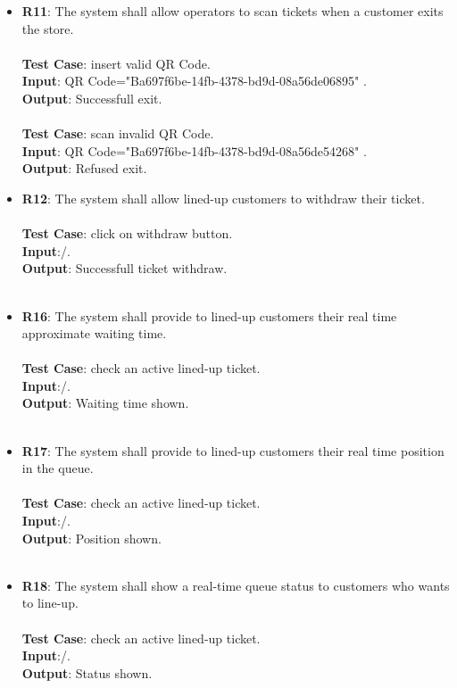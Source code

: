 \begin{itemize}
	\item \textbf{R11}: The system shall allow operators to scan tickets when a customer exits the store. \\ \\ \textbf{Test Case}: insert valid QR Code.  \\ 
 \textbf{Input}: QR Code="Ba697f6be-14fb-4378-bd9d-08a56de06895" .\\ 		\textbf{Output}: Successfull exit. \\ \\ \textbf{Test Case}: scan invalid QR Code.\\ 
 \textbf{Input}: QR Code="Ba697f6be-14fb-4378-bd9d-08a56de54268" .\\ 		\textbf{Output}: Refused exit. \\


	\item \textbf{R12}: The system shall allow lined-up customers to withdraw their ticket. \\ \\ \textbf{Test Case}: click on withdraw button.  \\ 
 \textbf{Input}:/.\\ 		\textbf{Output}: Successfull ticket withdraw. \\ \\


	\item \textbf{R16}: The system shall provide to lined-up customers their real time approximate waiting time. \\ \\ \textbf{Test Case}: check an active lined-up ticket.  \\ 
 \textbf{Input}:/.\\ 		\textbf{Output}: Waiting time shown. \\ \\


	\item \textbf{R17}: The system shall provide to lined-up customers their real time position in the queue. \\ \\ \textbf{Test Case}: check an active lined-up ticket.  \\ 
 \textbf{Input}:/.\\ 		\textbf{Output}: Position shown. \\ \\


	\item \textbf{R18}: The system shall show a real-time queue status to customers who wants to line-up. \\ \\ \textbf{Test Case}: check an active lined-up ticket.  \\ 
 \textbf{Input}:/.\\ 		\textbf{Output}: Status shown. \\ \\



\end{itemize}
